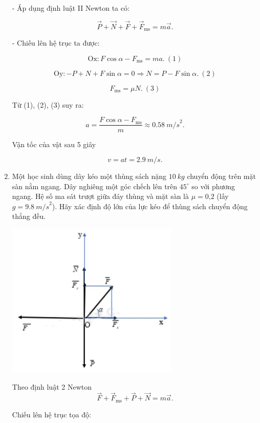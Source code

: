 \begin{enumerate}[label=\bfseries Bài \arabic*:,leftmargin=1.5cm]
{		- Áp dụng định luật II Newton ta có:
		
		$$\vec P + \vec N + \vec F + \vec F_\text{ms} = m\vec a.$$
		
		- Chiếu lên hệ trục ta được:
		
		$$\text{Ox}: F \cos \alpha - F_\text{ms} = ma.\ (1)$$
		
		$$\text{Oy}: - P + N + F \sin \alpha = 0 \Rightarrow N = P - F\sin \alpha.\ (2)$$
		
		$$F_\text{ms} = \mu N.\ (3)$$
		
		Từ (1), (2), (3) suy ra:
		
		$$a = \dfrac{F \cos \alpha - F_\text{ms}}{m} \approx \SI{0,58}{m/s}^2.$$
		
		Vận tốc của vật sau 5 giây
		
		$$v = at = \SI{2,9}{m/s}.$$
		
		
	}

	\item {}
	
	
	{
		Một học sinh dùng dây kéo một thùng sách nặng $\SI{10}{kg}$ chuyển động trên mặt sàn nằm ngang. Dây nghiêng một góc chếch lên trên $45^\circ$ so với phương ngang. Hệ số ma sát trượt giữa đáy thùng và mặt sàn là $\mu = \text{0,2}$ (lấy $g = \SI{9,8}{m/s}^2$). Hãy xác định độ lớn của lực kéo để thùng sách chuyển động thẳng đều.
	}
	
	\hideall
	{
		
		\begin{center}
			\includegraphics[scale=1]{../figs/VN10-2022-PH-TP021-12.jpg}
		\end{center}
		
		Theo định luật 2 Newton
		$$\vec F +\vec F_\text{ms} + \vec P + \vec N = m\vec a.$$
		
		Chiếu lên hệ trục tọa độ:
		
}
\end{enumerate}
